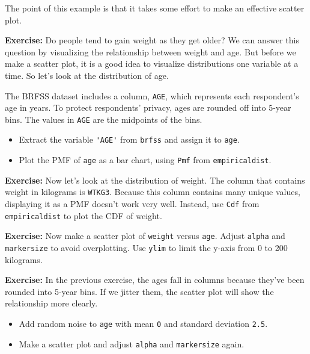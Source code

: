 The point of this example is that it takes some effort to make an
effective scatter plot.

\textbf{Exercise:} Do people tend to gain weight as they get older? We
can answer this question by visualizing the relationship between weight
and age. But before we make a scatter plot, it is a good idea to
visualize distributions one variable at a time. So let's look at the
distribution of age.

The BRFSS dataset includes a column, \passthrough{\lstinline!AGE!},
which represents each respondent's age in years. To protect respondents'
privacy, ages are rounded off into 5-year bins. The values in
\passthrough{\lstinline!AGE!} are the midpoints of the bins.

\begin{itemize}
\item
  Extract the variable \passthrough{\lstinline!'AGE'!} from
  \passthrough{\lstinline!brfss!} and assign it to
  \passthrough{\lstinline!age!}.
\item
  Plot the PMF of \passthrough{\lstinline!age!} as a bar chart, using
  \passthrough{\lstinline!Pmf!} from
  \passthrough{\lstinline!empiricaldist!}.
\end{itemize}

\textbf{Exercise:} Now let's look at the distribution of weight. The
column that contains weight in kilograms is
\passthrough{\lstinline!WTKG3!}. Because this column contains many
unique values, displaying it as a PMF doesn't work very well. Instead,
use \passthrough{\lstinline!Cdf!} from
\passthrough{\lstinline!empiricaldist!} to plot the CDF of weight.

\textbf{Exercise:} Now make a scatter plot of
\passthrough{\lstinline!weight!} versus \passthrough{\lstinline!age!}.
Adjust \passthrough{\lstinline!alpha!} and
\passthrough{\lstinline!markersize!} to avoid overplotting. Use
\passthrough{\lstinline!ylim!} to limit the y-axis from 0 to 200
kilograms.

\textbf{Exercise:} In the previous exercise, the ages fall in columns
because they've been rounded into 5-year bins. If we jitter them, the
scatter plot will show the relationship more clearly.

\begin{itemize}

\item
  Add random noise to \passthrough{\lstinline!age!} with mean
  \passthrough{\lstinline!0!} and standard deviation
  \passthrough{\lstinline!2.5!}.
\item
  Make a scatter plot and adjust \passthrough{\lstinline!alpha!} and
  \passthrough{\lstinline!markersize!} again.
\end{itemize}


